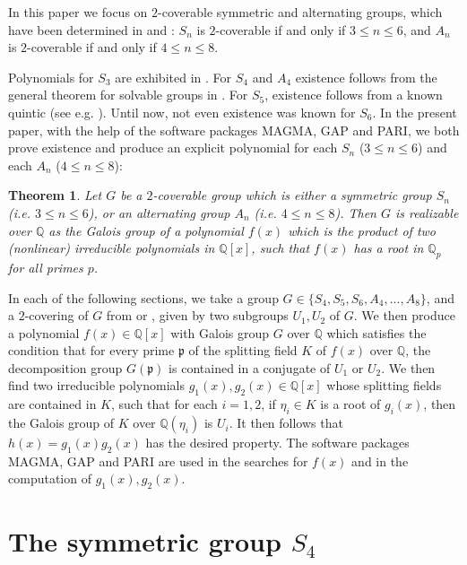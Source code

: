 \documentclass[reqno,12pt]{amsart}
\newtheorem{theorem}{Theorem}
\theoremstyle{remark}
\theoremstyle{definition}
\theoremstyle{citing}
\numberwithin{theorem}{section}
\numberwithin{equation}{section}
\begin{document}
In this paper we focus on $2$-coverable  symmetric and alternating groups, which have been determined in \cite{BBH} and \cite{Bubboloni}:  $S_n$ is $2$-coverable if and only if $3\leq  n \leq 6$, and $A_n$ is $2$-coverable if and only if $4\leq  n \leq 8$.

Polynomials for $S_3$ are exhibited in \cite{berend-bilu}.  For $S_4$ and $A_4$ existence follows from the general theorem for solvable groups in \cite{sonn}.  For $S_5$, existence follows from a known quintic (see e.g. \cite{sonnfrob}).  Until now, not even existence was known for $S_6$.  In the present paper, with the help of the software packages MAGMA, GAP and PARI, we both prove existence and produce an explicit polynomial for each $S_n$ ($3\leq  n \leq 6$) and each $A_n$ ($4\leq  n \leq 8$):

\begin{theorem}\label{main} Let $G$ be a $2$-coverable group which is either a symmetric group $S_n$ (i.e. $3\leq  n \leq 6$), or an alternating group $A_n$  (i.e. $4\leq  n \leq 8$).  Then $G$ is realizable over ${{\mathbb{{Q}}}}$ as the Galois group of a polynomial $f(x)$ which is the product of two (nonlinear) irreducible polynomials in ${{\mathbb{{Q}}}}[x]$, such that $f(x)$ has a root in ${{\mathbb{{Q}}}}_p$ for all primes $p$.
\end{theorem}

In each of the following sections, we take a group  $G \in \{S_4,S_5,S_6, A_4,...,A_8 \}$, and a $2$-covering of $G$ from \cite{BBH} or \cite{Bubboloni}, given by two subgroups $U_1,U_2$ of $G$.  We then produce a polynomial $f(x)\in {{\mathbb{{Q}}}}[x]$ with Galois group $G$ over ${{\mathbb{{Q}}}}$ which satisfies the condition that for
every prime $\mathfrak{p}$ of the splitting field $K$ of $f(x)$ over ${{\mathbb{{Q}}}}$, the decomposition
group $G(\mathfrak{p})$ is contained in a conjugate of $U_1$ or $U_2$.  We then find two irreducible polynomials $g_1(x),g_2(x)\in {{\mathbb{{Q}}}}[x]$ whose splitting fields are contained in $K$, such that for each $i=1,2$, if $\eta_i\in K$ is a root of $g_i(x)$,   then the Galois group of $K$ over ${{\mathbb{{Q}}}}(\eta_i)$ is $U_i$.  It then follows that $h(x)=g_1(x)g_2(x)$ has the desired property.  The software packages MAGMA, GAP and PARI are used in the searches for $f(x)$ and in the computation of $g_1(x),g_2(x)$.

\section{The symmetric group $S_{4}$}
\end{document}
